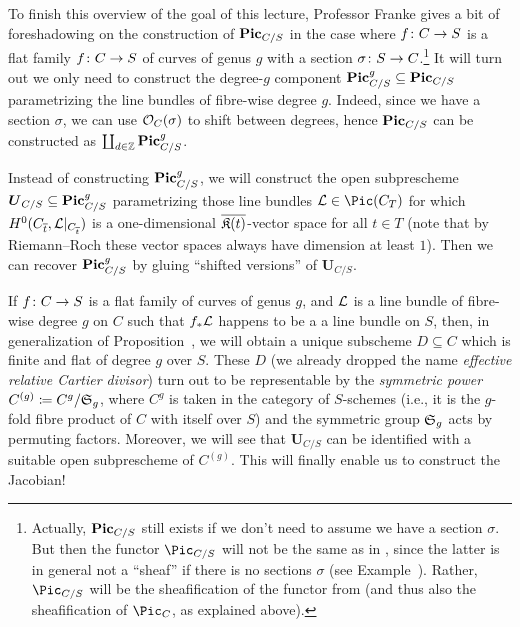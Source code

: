 \documentclass[a4paper,parskip=half,numbers=enddot, DIV=12]{scrreprt}
\begin{document}
To finish this overview of the goal of this lecture, Professor Franke gives a bit of foreshadowing on the construction of $\mathbf{Pic}_{C/S}$ in the case where $f\colon C\morphism S$ is a flat family $f\colon C\morphism S$ of curves of genus $g$ with a section $\sigma\colon S\morphism C$.\footnote{Actually, $\mathbf{Pic}_{C/S}$ still exists if we don't need to assume we have a section $\sigma$. But then the functor $\Pic_{C/S}$ will not be the same as in , since the latter is in general not a ``sheaf'' if there is no sections $\sigma$ (see Example~). Rather, $\Pic_{C/S}$ will be the sheafification of the functor from  (and thus also the sheafification of $\Pic_C$, as explained above).} It will turn out we only need to construct the degree-$g$ component $\mathbf{Pic}_{C/S}^g\subseteq\mathbf{Pic}_{C/S}$ parametrizing the line bundles of fibre-wise degree $g$. Indeed, since we have a section $\sigma$, we can use $\mathcal{O}_C(\sigma)$ to shift between degrees, hence $\mathbf{Pic}_{C/S}$ can be constructed as $\coprod_{d\in\mathbb{Z}}\mathbf{Pic}_{C/S}^g$. 

Instead of constructing $\mathbf{Pic}_{C/S}^g$, we will construct the open subprescheme $\boldsymbol{U}_{C/S}\subseteq \mathbf{Pic}_{C/S}^g$ parametrizing those line bundles $\Ll\in\Pic(C_T)$ for which $H^0(C_{\overline{t}},\mathcal{L}|_{C_{\overline{t}}})$ is a one-dimensional $\overline{\mathfrak{K}(t)}$-vector space for all $t\in T$ (note that by Riemann--Roch these vector spaces always have dimension at least $1$). Then we can recover $\mathbf{Pic}_{C/S}^g$ by gluing ``shifted versions'' of $\boldsymbol{U}_{C/S}$.

If $f\colon C\morphism S$ is a flat family of curves of genus $g$, and $\mathcal{L}$ is a line bundle of fibre-wise degree $g$ on $C$ such that $f_*\mathcal{L}$ happens to be a a line bundle on $S$, then, in generalization of Proposition~, we will obtain a unique subscheme $D\subseteq C$ which is finite and flat of degree $g$ over $S$. These $D$ (we already dropped the name \emph{effective relative Cartier divisor}) turn out to be representable by the \emph{symmetric power} $C^{(g)}\coloneqq C^{g}/\mathfrak{S}_g$, where $C^{g}$ is taken in the category of $S$-schemes (i.e., it is the $g$-fold fibre product of $C$ with itself over $S$) and the symmetric group $\mathfrak{S}_g$ acts by permuting factors. Moreover, we will see that $\boldsymbol{U}_{C/S}$ can be identified with a suitable open subprescheme of $C^{(g)}$. This will finally enable us to construct the Jacobian!
\end{document}
